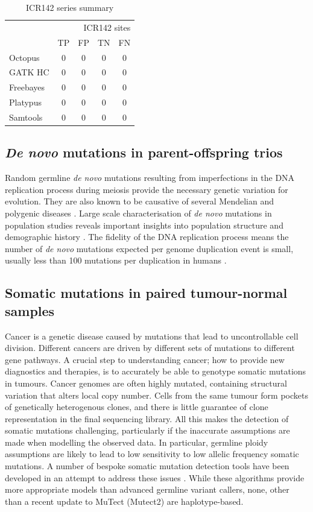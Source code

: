 \documentclass[notitlepage, twocolumn]{article}
\begin{document}
\begin{table}[ht]
\centering
\caption{ICR142 series summary}
\begin{tabular}{lcccc}
\hline
\multicolumn{5}{r}{ICR142 sites} \\
\cline{2-5} & TP & FP & TN & FN \\
\hline
Octopus & 0 & 0 & 0 & 0 \\
GATK HC & 0 & 0 & 0 & 0 \\
Freebayes & 0 & 0 & 0 & 0 \\
Platypus & 0 & 0 & 0 & 0 \\
Samtools & 0 & 0 & 0 & 0 \\
\hline
\end{tabular}
\end{table}

\subsection*{\emph{De novo} mutations in parent-offspring trios}

Random germline \emph{de novo} mutations resulting from imperfections in the DNA replication process during meiosis provide the necessary genetic variation for evolution. They are also known to be causative of several Mendelian and polygenic diseases \cite{RN157, RN160, RN159}. Large scale characterisation of \emph{de novo} mutations in population studies reveals important insights into population structure and demographic history \cite{RN158}. The fidelity of the DNA replication process means the number of \emph{de novo} mutations expected per genome duplication event is small, usually less than 100 mutations per duplication in humans \cite{RN6}.

\subsection*{Somatic mutations in paired tumour-normal samples}

Cancer is a genetic disease caused by mutations that lead to uncontrollable cell division. Different cancers are driven by different sets of mutations to different gene pathways. A crucial step to understanding cancer; how to provide new diagnostics and therapies, is to accurately be able to genotype somatic mutations in tumours. Cancer genomes are often highly mutated, containing structural variation that alters local copy number. Cells from the same tumour form pockets of genetically heterogenous clones, and there is little guarantee of clone representation in the final sequencing library. All this makes the detection of somatic mutations challenging, particularly if the inaccurate assumptions are made when modelling the observed data. In particular, germline ploidy assumptions are likely to lead to low sensitivity to low allelic frequency somatic mutations. A number of bespoke somatic mutation detection tools have been developed in an attempt to address these issues \cite{RN142, RN146, RN150, RN143, RN145}. While these algorithms provide more appropriate models than advanced germline variant callers, none, other than a recent update to MuTect (Mutect2) are haplotype-based.
\end{document}
